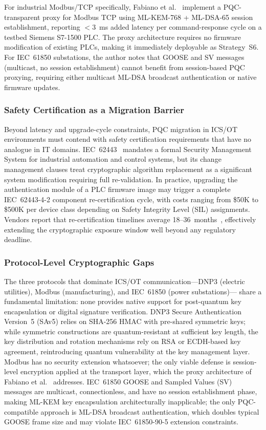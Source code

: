 \documentclass[journal]{IEEEtran}
\begin{document}
For industrial Modbus/TCP specifically, Fabiano et al.~\cite{fabiano2025proxy}
implement a PQC-transparent proxy for Modbus TCP using ML-KEM-768 + ML-DSA-65
session establishment, reporting $<$3~ms added latency per command-response
cycle on a testbed Siemens S7-1500 PLC. The proxy architecture requires no
firmware modification of existing PLCs, making it immediately deployable as
Strategy~S6. For IEC~61850 substations, the author notes that GOOSE and
SV messages (multicast, no session establishment) cannot benefit from
session-based PQC proxying, requiring either multicast ML-DSA broadcast
authentication or native firmware updates.

\subsubsection{Safety Certification as a Migration Barrier}

Beyond latency and upgrade-cycle constraints, PQC migration in ICS/OT
environments must contend with safety certification requirements that have
no analogue in IT domains. IEC~62443~\cite{iec62443} mandates a formal
Security Management System for industrial automation and control systems,
but its change management clauses treat cryptographic algorithm replacement
as a significant system modification requiring full re-validation. In
practice, upgrading the authentication module of a PLC firmware image may
trigger a complete IEC~62443-4-2 component re-certification cycle, with
costs ranging from \$50K to \$500K per device class depending on Safety
Integrity Level (SIL) assignments. Vendors report that re-certification
timelines average 18--36~months~\cite{olivamoral2024cybersecurity},
effectively extending the cryptographic exposure window well beyond any
regulatory deadline.

\subsubsection{Protocol-Level Cryptographic Gaps}

The three protocols that dominate ICS/OT communication---DNP3 (electric
utilities), Modbus (manufacturing), and IEC~61850 (power substations)---
share a fundamental limitation: none provides native support for
post-quantum key encapsulation or digital signature verification. DNP3
Secure Authentication Version~5 (SAv5) relies on SHA-256 HMAC with
pre-shared symmetric keys; while symmetric constructions are
quantum-resistant at sufficient key length, the key distribution and
rotation mechanisms rely on RSA or ECDH-based key agreement,
reintroducing quantum vulnerability at the key management layer. Modbus
has no security extension whatsoever; the only viable defense is
session-level encryption applied at the transport layer, which the proxy
architecture of Fabiano et al.~\cite{fabiano2025proxy} addresses.
IEC~61850 GOOSE and Sampled Values (SV) messages are multicast,
connectionless, and have no session establishment phase, making ML-KEM
key encapsulation architecturally inapplicable; the only PQC-compatible
approach is ML-DSA broadcast authentication, which doubles typical GOOSE
frame size and may violate IEC~61850-90-5 extension constraints.
\end{document}
